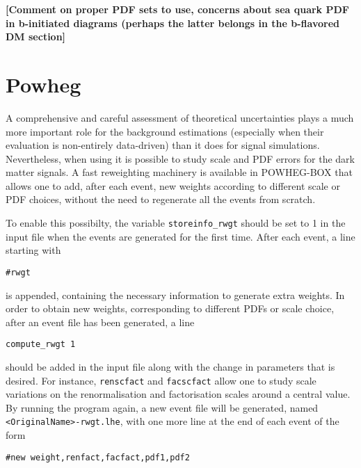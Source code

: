 

{\bf [Comment on proper PDF sets to use, concerns about sea quark PDF in b-initiated diagrams (perhaps the latter belongs in the b-flavored DM section]}

\section{Powheg}

A comprehensive and careful assessment of theoretical uncertainties
plays a much more important role for the background estimations
(especially when their evaluation is non-entirely data-driven) than it
does for signal simulations. Nevertheless, when using \powheg it is
possible to study scale and PDF errors for the dark matter signals. A
fast reweighting machinery is available in {\sc POWHEG-BOX} that
allows one to add, after each event, new weights according to
different scale or PDF choices, without the need to regenerate all the
events from scratch. 

To enable this possibilty, the variable \texttt{storeinfo\_rwgt} should be set 
to 1 in the \powheg input file when the events are generated for the 
first time. After each event, a line starting with 

\begin{verbatim}
#rwgt 
\end{verbatim}

is appended, containing the necessary information to generate extra 
weights. In order to obtain new weights, corresponding to different 
PDFs or scale choice, after an event file has been generated, a line 

\begin{verbatim}
compute_rwgt 1 
\end{verbatim}
should be added in the input file along with the change in parameters
that is desired. For instance, \texttt{renscfact} and
\texttt{facscfact} allow one to study scale variations on the
renormalisation and factorisation scales around a central value. By
running the program again, a new event file will be generated, named
\texttt{<OriginalName>-rwgt.lhe}, with one more line at the end of each event of the form

\begin{verbatim}
#new weight,renfact,facfact,pdf1,pdf2 
\end{verbatim}

